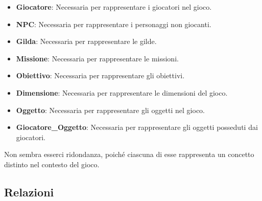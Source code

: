 \documentclass{article}
\begin{document}
\begin{itemize}
    \item \textbf{Giocatore}: Necessaria per rappresentare i giocatori nel gioco.
    \item \textbf{NPC}: Necessaria per rappresentare i personaggi non giocanti.
    \item \textbf{Gilda}: Necessaria per rappresentare le gilde.
    \item \textbf{Missione}: Necessaria per rappresentare le missioni.
    \item \textbf{Obiettivo}: Necessaria per rappresentare gli obiettivi.
    \item \textbf{Dimensione}: Necessaria per rappresentare le dimensioni del gioco.
    \item \textbf{Oggetto}: Necessaria per rappresentare gli oggetti nel gioco.
    \item \textbf{Giocatore\_Oggetto}: Necessaria per rappresentare gli oggetti posseduti dai giocatori.
\end{itemize}

Non sembra esserci ridondanza, poiché ciascuna di esse rappresenta un concetto distinto nel contesto del gioco.

\subsection*{Relazioni}
\end{document}
